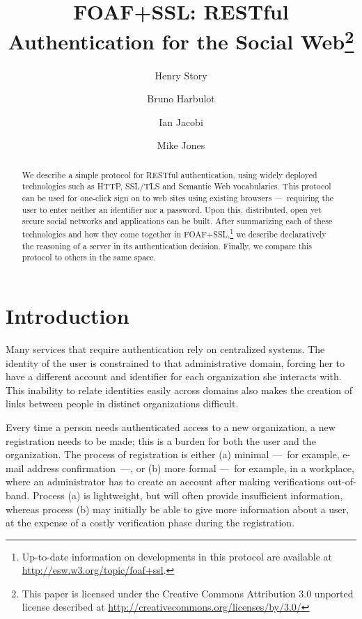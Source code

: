 \documentclass{llncs}
\begin{document}
\title{FOAF+SSL: RESTful Authentication for the Social Web\footnote{This paper is licensed under the Creative Commons Attribution 3.0 unported license described at \url{http://creativecommons.org/licenses/by/3.0/}}}
\author{Henry Story \and Bruno Harbulot \and Ian Jacobi \and Mike Jones}

\maketitle
\begin{abstract} 
 We describe a simple protocol for RESTful authentication, using
 widely deployed technologies such as HTTP, SSL/TLS and Semantic Web
 vocabularies.  This protocol can be used for one-click sign on to web sites using existing 
 browsers ---~requiring the user to enter neither an identifier nor a password.  Upon this, distributed, open yet secure social networks and applications can be built.  After summarizing each of these technologies and how
 they come together in FOAF+SSL,\footnote{Up-to-date information on
   developments in this protocol are available at
   \url{http://esw.w3.org/topic/foaf+ssl}.} we describe declaratively the
 reasoning of a server in its authentication decision. Finally, we compare this protocol to 
 others in the same space.
\end{abstract}
\section{Introduction}

Many services that require authentication rely on centralized systems.
  The identity of the user is constrained
to that administrative domain, forcing her to have a different account and identifier
for each organization she interacts with. This inability to relate identities easily across
domains also makes the creation of links between people in distinct organizations 
difficult.

Every time a person needs authenticated access to a new
organization, a new registration needs to be made; this is a burden
for both the user and the organization. The process of registration is
either (a) minimal ---~for example, e-mail address confirmation~---, or
(b) more formal ---~for example, in a workplace, where an
administrator has to create an account after making verifications
out-of-band. Process (a) is lightweight, but will often provide
insufficient information, whereas process (b) may initially be able to give more
information about a user, at the expense of a costly
verification phase during the registration.
\end{document}
